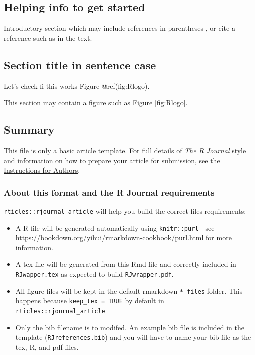 
\hypertarget{helping-info-to-get-started}{%
\subsection{Helping info to get
started}\label{helping-info-to-get-started}}

Introductory section which may include references in parentheses
\citep{R}, or cite a reference such as \citet{R} in the text.

\hypertarget{section-title-in-sentence-case}{%
\subsection{Section title in sentence
case}\label{section-title-in-sentence-case}}

Let's check fi this works Figure @ref(fig:Rlogo).

This section may contain a figure such as Figure \ref{fig:Rlogo}.

\hypertarget{summary}{%
\subsection{Summary}\label{summary}}

This file is only a basic article template. For full details of
\emph{The R Journal} style and information on how to prepare your
article for submission, see the
\href{https://journal.r-project.org/share/author-guide.pdf}{Instructions
for Authors}.

\hypertarget{about-this-format-and-the-r-journal-requirements}{%
\subsubsection{About this format and the R Journal
requirements}\label{about-this-format-and-the-r-journal-requirements}}

\texttt{rticles::rjournal\_article} will help you build the correct
files requirements:

\begin{itemize}
\tightlist
\item
  A R file will be generated automatically using \texttt{knitr::purl} -
  see \url{https://bookdown.org/yihui/rmarkdown-cookbook/purl.html} for
  more information.
\item
  A tex file will be generated from this Rmd file and correctly included
  in \texttt{RJwapper.tex} as expected to build \texttt{RJwrapper.pdf}.
\item
  All figure files will be kept in the default rmarkdown
  \texttt{*\_files} folder. This happens because
  \texttt{keep\_tex\ =\ TRUE} by default in
  \texttt{rticles::rjournal\_article}
\item
  Only the bib filename is to modifed. An example bib file is included
  in the template (\texttt{RJreferences.bib}) and you will have to name
  your bib file as the tex, R, and pdf files.
\end{itemize}

